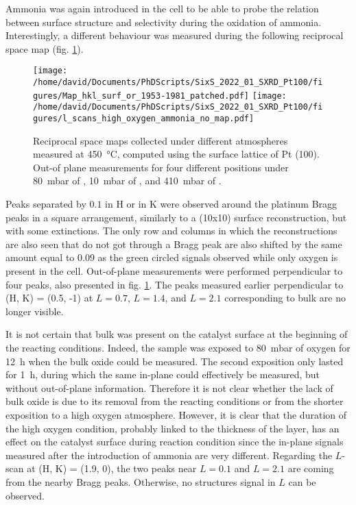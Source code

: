 Ammonia was again introduced in the cell to be able to probe the relation between surface structure and selectivity during the oxidation of ammonia.
Interestingly, a different behaviour was measured during the following reciprocal space map (fig. \ref{fig:MapsAndLScansPt100HighOxAmmonia}).

\begin{figure}[!htb]
    \centering
    \texttt{[image: /home/david/Documents/PhDScripts/SixS\_2022\_01\_SXRD\_Pt100/figures/Map\_hkl\_surf\_or\_1953-1981\_patched.pdf]}
    \texttt{[image: /home/david/Documents/PhDScripts/SixS\_2022\_01\_SXRD\_Pt100/figures/l\_scans\_high\_oxygen\_ammonia\_no\_map.pdf]}
    \caption{
        Reciprocal space maps collected under different atmospheres measured at \qty{450}{\degreeCelsius}, computed using the surface lattice of Pt (100).
        Out-of plane measurements for four different positions under \qty{80}{\milli\bar} of , \qty{10}{\milli\bar} of , and \qty{410}{\milli\bar} of .
    }
    \label{fig:MapsAndLScansPt100HighOxAmmonia}
\end{figure}

Peaks separated by $0.1$ in H or in K were observed around the platinum Bragg peaks in a square arrangement, similarly to a (10x10) surface reconstruction, but with some extinctions.
The only row and columns in which the reconstructions are also seen that do not got through a Bragg peak are also shifted by the same amount equal to $0.09$ as the green circled signals observed while only oxygen is present in the cell.
Out-of-plane measurements were performed perpendicular to four peaks, also presented in fig. \ref{fig:MapsAndLScansPt100HighOxAmmonia}.
The peaks measured earlier perpendicular to (H, K) = (0.5, -1) at $L=0.7$, $L=1.4$, and $L=2.1$ corresponding to bulk  are no longer visible.

It is not certain that bulk  was present on the catalyst surface at the beginning of the reacting conditions.
Indeed, the sample was exposed to \qty{80}{\milli\bar} of oxygen for \qty{12}{\hour} when the bulk oxide could be measured.
The second exposition only lasted for \qty{1}{\hour}, during which the same in-plane could effectively be measured, but without out-of-plane information.
Therefore it is not clear whether the lack of bulk oxide is due to its removal from the reacting conditions or from the shorter exposition to a high oxygen atmosphere.
However, it is clear that the duration of the high oxygen condition, probably linked to the thickness of the  layer, has an effect on the catalyst surface during reaction condition since the in-plane signals measured after the introduction of ammonia are very different.
Regarding the $L$-scan at (H, K) = (1.9, 0), the two peaks near $L=0.1$ and $L=2.1$ are coming from the nearby Bragg peaks.
Otherwise, no structures signal in $L$ can be observed.

